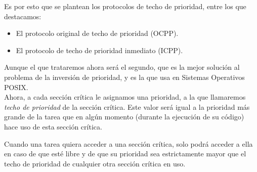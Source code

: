 Es por esto que se plantean los protocolos de techo de prioridad, entre los que destacamos:
\begin{itemize}
    \item El protocolo original de techo de prioridad (OCPP).
    \item El protocolo de techo de prioridad inmediato (ICPP).
\end{itemize}
Aunque el que trataremos ahora será el segundo, que es la mejor solución al problema de la inversión de prioridad, y es la que usa en Sistemas Operativos POSIX\@.\\

Ahora, a cada sección crítica le asignamos una prioridad, a la que llamaremos \textit{techo de prioridad} de la sección crítica. Este valor será igual a la prioridad más grande de la tarea que en algún momento (durante la ejecución de su código) hace uso de esta sección crítica.

Cuando una tarea quiera acceder a una sección crítica, solo podrá acceder a ella en caso de que esté libre y de que su prioridad sea estrictamente mayor que el techo de prioridad de cualquier otra sección crítica en uso.

